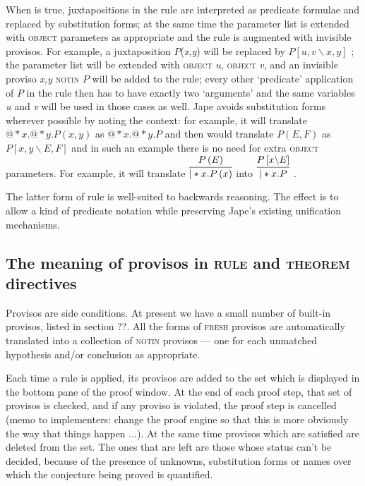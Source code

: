 When  is true, juxtapositions in the rule are interpreted as predicate formulae and replaced by substitution forms; at the same time the parameter list is extended with \textsc{object} parameters as appropriate and the rule is augmented with invisible provisos. For example, a juxtaposition $P$(\textit{x},\textit{y}) will be replaced by $P\left[ u,v\backslash x,y\right] $ ; the parameter list will be extended with \textsc{object} \textit{u}, \textsc{object} \textit{v}, and an invisible proviso \textit{x,y} \textsc{notin} $P$ will be added to the rule; every other `predicate' application of $P$ in the rule then has to have exactly two `arguments' and the same variables \textit{u} and \textit{v} will be used in those cases as well. Jape avoids substitution forms wherever possible by noting the context: for example, it will translate $@*x.@*y.P\left( x,y\right) $ as $@*x.@*y.P$ and then would translate $P\left( E,F\right) $ as $P\left[ x,y\backslash E,F\right] $ and in such an example there is no need for extra \textsc{object} parameters. For example, it will translate $\infer{|*x.P\left( x\right) }
       {P\left( E\right) }$ into $\infer{|*x.P}
       {P\left[ x\backslash E\right] }$ .

The latter form of rule is well-suited to backwards reasoning. The effect is to allow a kind of predicate notation while preserving Jape's existing unification mechanisms.

\subsection{The meaning of provisos in \textsc{rule} and \textsc{theorem} directives}

Provisos are side conditions. At present we have a small number of built-in provisos, listed in section ??. All the forms of \textsc{fresh} provisos are automatically translated into a collection of \textsc{notin} provisos --- one for each unmatched hypothesis and/or conclusion as appropriate.

Each time a rule is applied, its provisos are added to the set which is displayed in the bottom pane of the proof window. At the end of each proof step, that set of provisos is checked, and if any proviso is violated, the proof step is cancelled (memo to implementers: change the proof engine so that this is more obviously the way that things happen ...). At the same time provisos which are satisfied are deleted from the set. The ones that are left are those whose status can't be decided, because of the presence of unknowns, substitution forms or names over which the conjecture being proved is quantified.

